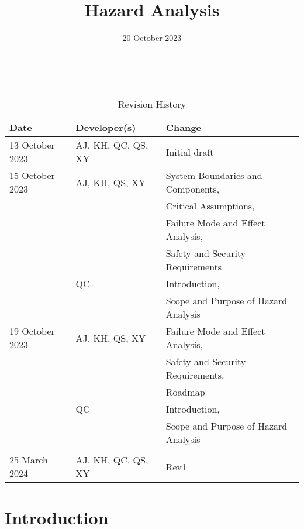 \documentclass{article}
\title{Hazard Analysis\\\progname}
\author{\authname}
\date{20 October 2023}
\begin{document}
\maketitle
\thispagestyle{empty}

~\newpage


\begin{table}[hp]
  \caption{Revision History} \label{TblRevisionHistory}
  \begin{tabularx}{\textwidth}{llX}
    \toprule
    \textbf{Date} & \textbf{Developer(s)} & \textbf{Change}\\
    \midrule
    13 October 2023 & AJ, KH, QC, QS, XY & Initial draft \\
    \midrule
    15 October 2023 & AJ, KH, QS, XY & System Boundaries and Components,\\
    & & Critical Assumptions,\\
    & & Failure Mode and Effect Analysis,\\
    & & Safety and Security Requirements\\
    \midrule
    & QC & Introduction,\\
    & & Scope and Purpose of Hazard Analysis\\
    \midrule
    19 October 2023 & AJ, KH, QS, XY & Failure Mode and Effect Analysis,\\
    & & Safety and Security Requirements,\\
    & & Roadmap\\
    \midrule
    & QC & Introduction,\\
    & & Scope and Purpose of Hazard Analysis\\
    \midrule\\
    25 March 2024 & AJ, KH, QC, QS, XY & Rev1 \\
    \bottomrule
  \end{tabularx}
\end{table}

\newpage{}

\tableofcontents{}
\listoftables{}

\newpage{}


\section{Introduction}
\end{document}

